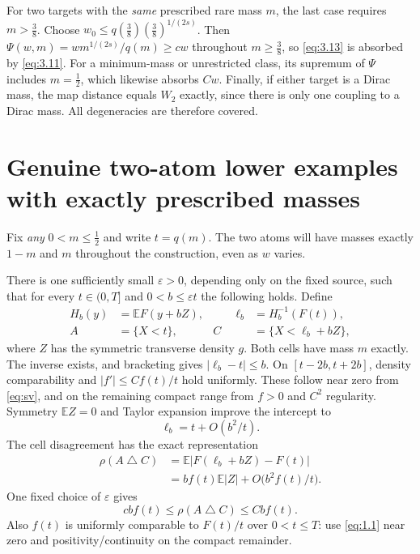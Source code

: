 For two targets with the \emph{same} prescribed rare mass $m$, the last case requires $m>\tfrac38$. Choose $w_0\le q(\tfrac38)(\tfrac38)^{1/(2s)}$. Then $\Psi(w,m)=w m^{1/(2s)}/q(m)\ge cw$ throughout $m\ge\tfrac38$, so \eqref{eq:3.13} is absorbed by \eqref{eq:3.11}. For a minimum-mass or unrestricted class, its supremum of $\Psi$ includes $m=\tfrac12$, which likewise absorbs $Cw$. Finally, if either target is a Dirac mass, the map distance equals $W_2$ exactly, since there is only one coupling to a Dirac mass. All degeneracies are therefore covered.

\section{Genuine two-atom lower examples with exactly prescribed masses}

Fix \emph{any} $0<m\le\tfrac12$ and write $t=q(m)$. The two atoms will have masses exactly $1-m$ and $m$ throughout the construction, even as $w$ varies.

There is one sufficiently small $\varepsilon>0$, depending only on the fixed source, such that for every $t\in(0,T]$ and $0<b\le\varepsilon t$ the following holds. Define
\[
  \begin{aligned}
  H_b(y)&=\mathbb E F(y+bZ),&\qquad \ell_b&=H_b^{-1}(F(t)),\\
  A&=\{X<t\},& C&=\{X<\ell_b+bZ\},
  \end{aligned}
\]
where $Z$ has the symmetric transverse density $g$. Both cells have mass $m$ exactly. The inverse exists, and bracketing gives $|\ell_b-t|\le b$. On $[t-2b,t+2b]$, density comparability and $|f'|\le Cf(t)/t$ hold uniformly. These follow near zero from \eqref{eq:sv}, and on the remaining compact range from $f>0$ and $C^2$ regularity. Symmetry $\mathbb E Z=0$ and Taylor expansion improve the intercept to
\begin{equation}
  \ell_b=t+O(b^2/t).
  \tag{4.1}\label{eq:4.1}
\end{equation}
The cell disagreement has the exact representation
\[
  \begin{aligned}
  \rho(A\mathbin{\triangle}C)
  &=\mathbb E\bigl|F(\ell_b+bZ)-F(t)\bigr|\\
  &=b f(t)\mathbb E|Z|+O\bigl(b^2 f(t)/t\bigr).
  \end{aligned}
\]
One fixed choice of $\varepsilon$ gives
\begin{equation}
  cbf(t)\le\rho(A\mathbin{\triangle}C)\le Cbf(t).
  \tag{4.2}\label{eq:4.2}
\end{equation}
Also $f(t)$ is uniformly comparable to $F(t)/t$ over $0<t\le T$: use \eqref{eq:1.1} near zero and positivity/continuity on the compact remainder.

